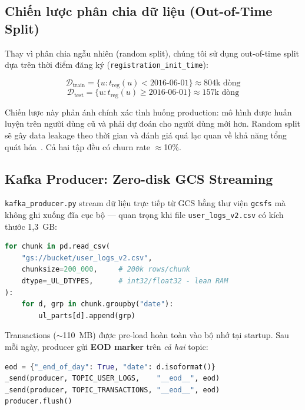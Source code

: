 \documentclass[conference]{IEEEtran}
\begin{document}
\subsection{Chiến lược phân chia dữ liệu (Out-of-Time Split)}

Thay vì phân chia ngẫu nhiên (random split), chúng tôi sử dụng out-of-time
split dựa trên thời điểm đăng ký (\texttt{registration\_init\_time}):

\begin{equation}
  \mathcal{D}_\text{train} = \{u : t_\text{reg}(u) < \text{2016-06-01}\}
  \approx 804\text{k dòng}
\end{equation}
\begin{equation}
  \mathcal{D}_\text{test}  = \{u : t_\text{reg}(u) \geq \text{2016-06-01}\}
  \approx 157\text{k dòng}
\end{equation}

Chiến lược này phản ánh chính xác tình huống production: mô hình được huấn
luyện trên người dùng cũ và phải dự đoán cho người dùng mới hơn. Random split
sẽ gây data leakage theo thời gian và đánh giá quá lạc quan về khả năng tổng
quát hóa~\cite{oot_split}. Cả hai tập đều có churn rate $\approx$10\%.

\subsection{Kafka Producer: Zero-disk GCS Streaming}

\texttt{kafka\_producer.py} stream dữ liệu trực tiếp từ GCS bằng thư viện
\texttt{gcsfs} mà không ghi xuống đĩa cục bộ — quan trọng khi file
\texttt{user\_logs\_v2.csv} có kích thước 1,3~GB:

\begin{lstlisting}[language=Python, caption={GCS streaming theo chunk}]
for chunk in pd.read_csv(
    "gs://bucket/user_logs_v2.csv",
    chunksize=200_000,     # 200k rows/chunk
    dtype=_UL_DTYPES,      # int32/float32 - lean RAM
):
    for d, grp in chunk.groupby("date"):
        ul_parts[d].append(grp)
\end{lstlisting}

Transactions ($\sim$110~MB) được pre-load hoàn toàn vào bộ nhớ tại startup.
Sau mỗi ngày, producer gửi \textbf{EOD marker} trên \emph{cả hai} topic:

\begin{lstlisting}[language=Python, caption={Dual EOD marker sau mỗi ngày}]
eod = {"_end_of_day": True, "date": d.isoformat()}
_send(producer, TOPIC_USER_LOGS,    "__eod__", eod)
_send(producer, TOPIC_TRANSACTIONS, "__eod__", eod)
producer.flush()
\end{lstlisting}
\end{document}

